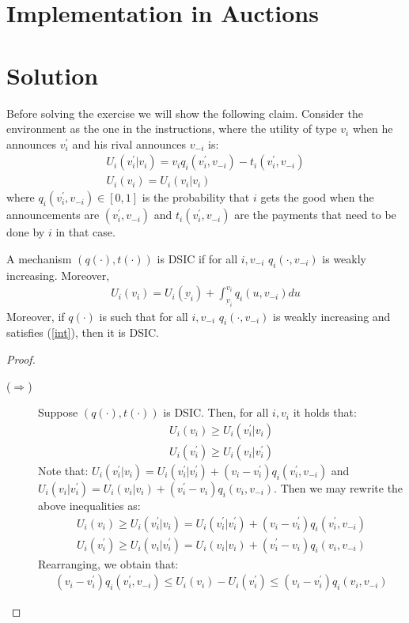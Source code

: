 \documentclass{article}
\newcommand{\enterProblemHeader}[1]{
\nobreak\extramarks{#1}{#1 continued on next page\ldots}\nobreak
\nobreak\extramarks{#1 (continued)}{#1 continued on next page\ldots}\nobreak
}
\newcommand{\exitProblemHeader}[1]{
\nobreak\extramarks{#1 (continued)}{#1 continued on next page\ldots}\nobreak
\nobreak\extramarks{#1}{}\nobreak
}
\newcounter{homeworkProblemCounter} %
\newcommand{\homeworkProblemName}{}
\newenvironment{ex}[1][Problem \arabic{homeworkProblemCounter}]{ %
\stepcounter{homeworkProblemCounter} %
\renewcommand{\homeworkProblemName}{#1} %
\section{\homeworkProblemName} %
}{
}
\begin{document}
\begin{ex}[Implementation in Auctions]
	\section*{Solution}
	Before solving the exercise we will show the following claim. Consider the environment as the one in the instructions, where the utility of type $v_i$ when he announces $v_i^{'}$ and his rival announces $v_{-i}$ is:
	\begin{eqnarray}
	U_{i}(v_i^{'}|v_{i})=v_iq_i(v_{i}^{'},v_{-i})-t_i(v_{i}^{'},v_{-i})\\
	U_i(v_{i})=U_i(v_i|v_i)
	\end{eqnarray}
	where $q_i(v_{i}^{'},v_{-i})\in[0,1]$ is the probability that $i$ gets the good when the announcements are $(v_i^{'},v_{-i})$ and $t_i(v_{i}^{'},v_{-i})$ are the payments that need to be done by $i$ in that case.
	\begin{lem}
		A mechanism $(q(\cdot),t(\cdot))$ is DSIC if for all $i,v_{-i}$ $q_{i}(\cdot,v_{-i})$ is weakly increasing. Moreover,
		\begin{eqnarray}\label{int}
		U_{i}(v_i)=U_i(\underbar{v}_{i})+\int_{\underbar{v}_{i}}^{v_i}q_{i}(u,v_{-i})du
		\end{eqnarray}
		Moreover, if $q(\cdot)$ is such that for all $i,v_{-i}$ $q_{i}(\cdot,v_{-i})$ is weakly increasing and satisfies (\ref{int}), then it is DSIC.
	\end{lem}
	\begin{proof}
		\begin{description}
			\item [($\Rightarrow$)] Suppose $(q(\cdot),t(\cdot))$ is DSIC. Then, for all $i,v_i$ it holds that:
			\begin{eqnarray}
			U_i(v_i)\geq U_i(v_i^{'}|v_i)\\
			U_i(v_{i}^{'})\geq U_i(v_i|v_i^{'})
			\end{eqnarray}
			Note that: $U_i(v_i^{'}|v_i)=U_i(v_{i}^{'}|v_{i}^{'})+(v_i-v_i^{'})q_i(v_i^{'},v_{-i})$ and $U_i(v_i|v_i^{'})=U_i(v_{i}|v_{i})+(v_i^{'}-v_i)q_i(v_i,v_{-i})$. Then we may rewrite the above inequalities as:
			\begin{eqnarray}
			U_i(v_i)\geq U_i(v_i^{'}|v_i)=U_i(v_{i}^{'}|v_{i}^{'})+(v_i-v_i^{'})q_i(v_i^{'},v_{-i})\\
			U_i(v_{i}^{'})\geq U_i(v_i|v_i^{'})=U_i(v_{i}|v_{i})+(v_i^{'}-v_i)q_i(v_i,v_{-i})
			\end{eqnarray}
			Rearranging, we obtain that:
			\begin{eqnarray}
			(v_i-v_{i}^{'})q_i(v_i^{'},v_{-i})\leq U_i(v_i)-U_{i}(v_i^{'})\leq (v_i-v_{i}^{'})q_i(v_i,v_{-i})

\end{eqnarray}
\end{description}
\end{proof}
\end{ex}
\end{document}
